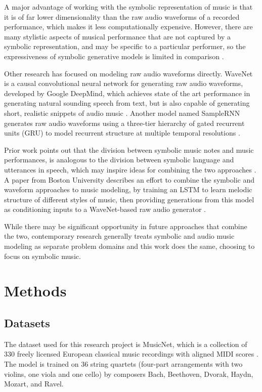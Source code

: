 \documentclass[sigconf,authorversion]{acmart}
\begin{document}
A major advantage of working with the symbolic representation of music
is that it is of far lower dimensionality than the raw audio waveforms
of a recorded performance, which makes it less computationally
expensive. However, there are many stylistic aspects of musical
performance that are not captured by a symbolic representation, and
may be specific to a particular performer, so the expressiveness of
symbolic generative models is limited in comparison
\cite{manzelli_conditioning_2018}.

Other research has focused on modeling raw audio waveforms directly. WaveNet is
a causal convolutional neural network for generating raw audio waveforms,
developed by Google DeepMind, which achieves state of the art performance in
generating natural sounding speech from text, but is also capable of generating
short, realistic snippets of audio music \cite{oord_wavenet_2016}.
Another model named SampleRNN generates raw audio waveforms using a three-tier
hierarchy of gated recurrent units (GRU) to model recurrent structure at
multiple temporal resolutions \cite{mehri_samplernn_2017}.

Prior work points out that the division between symbolic music notes
and music performances, is analogous to the division between symbolic
language and utterances in speech, which may inspire ideas for
combining the two approaches \cite{hawthorne2019enabling}. A paper
from Boston University describes an effort to combine the symbolic and
waveform approaches to music modeling, by training an LSTM to learn
melodic structure of different styles of music, then providing
generations from this model as conditioning inputs to a WaveNet-based
raw audio generator \cite{manzelli_conditioning_2018}.

While there may be significant opportunity in future approaches that
combine the two, contemporary research generally treats symbolic and
audio music modeling as separate problem domains and this work does
the same, choosing to focus on symbolic music.

\section{Methods}

\subsection{Datasets}

The dataset used for this research project is MusicNet, which is a
collection of 330 freely licensed European classical music recordings
with aligned MIDI scores \cite{thickstun2017learning}.  The model is
trained on 36 string quartets (four-part arrangements with two
violins, one viola and one cello) by composers Bach, Beethoven,
Dvorak, Haydn, Mozart, and Ravel.
\end{document}
